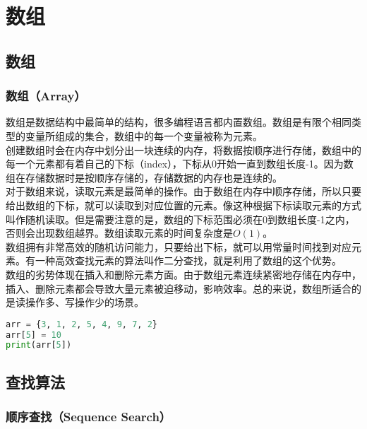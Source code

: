 \chapter{数组}

\section{数组}

\subsection{数组（Array）}

数组是数据结构中最简单的结构，很多编程语言都内置数组。数组是有限个相同类型的变量所组成的集合，数组中的每一个变量被称为元素。\\

创建数组时会在内存中划分出一块连续的内存，将数据按顺序进行存储，数组中的每一个元素都有着自己的下标（index），下标从0开始一直到数组长度-1。因为数组在存储数据时是按顺序存储的，存储数据的内存也是连续的。\\

对于数组来说，读取元素是最简单的操作。由于数组在内存中顺序存储，所以只要给出数组的下标，就可以读取到对应位置的元素。像这种根据下标读取元素的方式叫作随机读取。但是需要注意的是，数组的下标范围必须在0到数组长度-1之内，否则会出现数组越界。数组读取元素的时间复杂度是$ O(1) $。\\

数组拥有非常高效的随机访问能力，只要给出下标，就可以用常量时间找到对应元素。有一种高效查找元素的算法叫作二分查找，就是利用了数组的这个优势。\\

数组的劣势体现在插入和删除元素方面。由于数组元素连续紧密地存储在内存中，插入、删除元素都会导致大量元素被迫移动，影响效率。总的来说，数组所适合的是读操作多、写操作少的场景。\\


\begin{lstlisting}[language=Python]
arr = {3, 1, 2, 5, 4, 9, 7, 2}
arr[5] = 10
print(arr[5])
\end{lstlisting}

\newpage

\section{查找算法}

\subsection{顺序查找（Sequence Search）}

